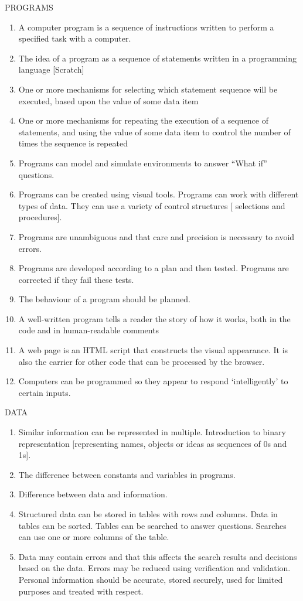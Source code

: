PROGRAMS
\begin{enumerate}
\item A computer program is a sequence of instructions written to perform a specified task
with a computer.
\item The idea of a program as a sequence of statements written in a programming
language [Scratch]
\item One or more mechanisms for selecting which statement sequence will be executed,
based upon the value of some data item
\item One or more mechanisms for repeating the execution of a sequence of statements,
and using the value of some data item to control the number of times the sequence
is repeated
\item Programs can model and simulate environments to answer “What if” questions. 
\item Programs can be created using visual tools. Programs can work with different types
of data. They can use a variety of control structures [ selections and procedures].
\item Programs are unambiguous and that care and precision is necessary to avoid errors.
\item Programs are developed according to a plan and then tested. Programs are
corrected if they fail these tests.
\item The behaviour of a program should be planned.
\item A well-written program tells a reader the story of how it works, both in the code and
in human-readable comments
\item A web page is an HTML script that constructs the visual appearance. It is also the
carrier for other code that can be processed by the browser.
\item Computers can be programmed so they appear to respond ‘intelligently’ to certain
inputs.
\end{enumerate}

DATA
\begin{enumerate}
\item Similar information can be represented in multiple.
Introduction to binary representation [representing names, objects or ideas as
sequences of 0s and 1s].
\item The difference between constants and variables in programs.
\item Difference between data and information.
\item Structured data can be stored in tables with rows and columns. Data in tables can be
sorted. Tables can be searched to answer questions. Searches can use one or more
columns of the table.
\item Data may contain errors and that this affects the search results and decisions based
on the data. Errors may be reduced using verification and validation.
Personal information should be accurate, stored securely, used for limited purposes
and treated with respect.
\end{enumerate}

